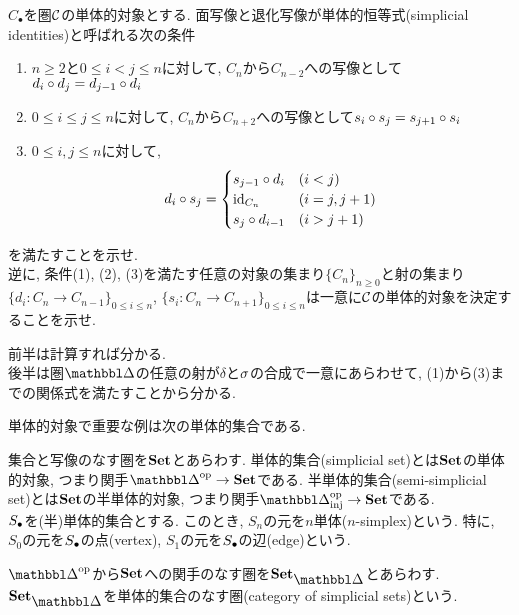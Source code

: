 \documentclass[uplatex, a4paper, 14Q, dvipdfmx]{jsreport}
\begin{document}
\begin{exe}
  $C_{\bullet}$を圏$\calC$の単体的対象とする. 
  面写像と退化写像が単体的恒等式(simplicial identities)と呼ばれる次の条件
  \begin{enumerate}
    \item $n \geq 2$と$0 \leq i < j \leq n$に対して, $C_n$から$C_{n-2}$への写像として$d_i \ci d_j = d_{j-1} \ci d_i$
    \item $0 \leq i \leq j \leq n$に対して, $C_n$から$C_{n+2}$への写像として$s_i \ci s_j = s_{j+1} \ci s_i$
    \item $0 \leq i,j \leq n$に対して, 
    \begin{align*}
      d_i \ci s_j =
      \begin{cases}
        s_{j-1} \ci d_i & (i < j) \\
        \id_{C_n} & (i=j,j+1) \\
        s_j \ci d_{i-1} & (i > j+1) 
      \end{cases}
    \end{align*}
  \end{enumerate} 
  を満たすことを示せ. \\
  逆に, 条件(1), (2), (3)を満たす任意の対象の集まり$\{C_n\}_{n \geq 0}$と射の集まり
  $\{d_i: C_n \to C_{n-1}\}_{0 \leq i \leq n}$, $\{s_i: C_n \to C_{n+1}\}_{0 \leq i \leq n}$は一意に$\calC$の単体的対象を決定することを示せ.
\end{exe}

\begin{Proof}
  前半は計算すれば分かる. \\
  後半は圏$\csim$の任意の射が$\delta$と$\si$の合成で一意にあらわせて, (1)から(3)までの関係式を満たすことから分かる. 
\end{Proof}

単体的対象で重要な例は次の単体的集合である. 

\begin{definition}
  集合と写像のなす圏を$\cset$とあらわす. 
  単体的集合(simplicial set)とは$\cset$の単体的対象, つまり関手$\simop \to \cset$である. 
  半単体的集合(semi-simplicial set)とは$\cset$の半単体的対象, つまり関手$\insimop \to \cset$である. \\
  $\S$を(半)単体的集合とする. 
  このとき, $S_n$の元を$n$単体($n$-simplex)という. 
  特に, $S_0$の元を$\S$の点(vertex), $S_1$の元を$\S$の辺(edge)という.  
\end{definition}

$\simop$から$\cset$への関手のなす圏を$\sset$とあらわす. 
$\sset$を単体的集合のなす圏(category of simplicial sets)という. 
\end{document}
